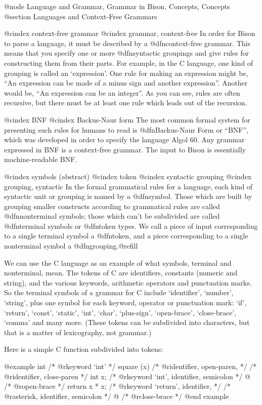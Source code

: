 @node Language and Grammar, Grammar in Bison, Concepts, Concepts
@section Languages and Context-Free Grammars

@cindex context-free grammar
@cindex grammar, context-free
In order for Bison to parse a language, it must be described by a
@dfn{context-free grammar}.  This means that you specify one or more
@dfn{syntactic groupings} and give rules for constructing them from their
parts.  For example, in the C language, one kind of grouping is called an
`expression'.  One rule for making an expression might be, ``An expression
can be made of a minus sign and another expression''.  Another would be,
``An expression can be an integer''.  As you can see, rules are often
recursive, but there must be at least one rule which leads out of the
recursion.

@cindex BNF
@cindex Backus-Naur form
The most common formal system for presenting such rules for humans to read
is @dfn{Backus-Naur Form} or ``BNF'', which was developed in order to
specify the language Algol 60.  Any grammar expressed in BNF is a
context-free grammar.  The input to Bison is essentially machine-readable
BNF.

@cindex symbols (abstract)
@cindex token
@cindex syntactic grouping
@cindex grouping, syntactic
In the formal grammatical rules for a language, each kind of syntactic unit
or grouping is named by a @dfn{symbol}.  Those which are built by grouping
smaller constructs according to grammatical rules are called
@dfn{nonterminal symbols}; those which can't be subdivided are called
@dfn{terminal symbols} or @dfn{token types}.  We call a piece of input
corresponding to a single terminal symbol a @dfn{token}, and a piece
corresponding to a single nonterminal symbol a @dfn{grouping}.@refill

We can use the C language as an example of what symbols, terminal and
nonterminal, mean.  The tokens of C are identifiers, constants (numeric and
string), and the various keywords, arithmetic operators and punctuation
marks.  So the terminal symbols of a grammar for C include `identifier',
`number', `string', plus one symbol for each keyword, operator or
punctuation mark: `if', `return', `const', `static', `int', `char',
`plus-sign', `open-brace', `close-brace', `comma' and many more.  (These
tokens can be subdivided into characters, but that is a matter of
lexicography, not grammar.)

Here is a simple C function subdivided into tokens:

@example
int             /* @r{keyword `int'} */
square (x)      /* @r{identifier, open-paren,} */
                /* @r{identifier, close-paren} */
     int x;     /* @r{keyword `int', identifier, semicolon} */
@{               /* @r{open-brace} */
  return x * x; /* @r{keyword `return', identifier,} */
                /* @r{asterisk, identifier, semicolon} */
@}               /* @r{close-brace} */
@end example

